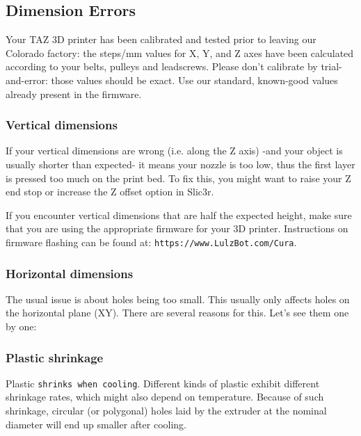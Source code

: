 
\subsection{Dimension Errors}
\label{sec:dimension_errors}

Your TAZ 3D printer has been calibrated and tested prior to leaving our Colorado factory: the steps/mm values for X, Y, and Z axes have been calculated according to your belts, pulleys and leadscrews. Please don't calibrate by trial-and-error: those values should be exact. Use our standard, known-good values already present in the firmware.

\subsubsection{Vertical dimensions}

If your vertical dimensions are wrong (i.e. along the Z axis) -and your object is usually shorter than expected- it means your nozzle is too low, thus the first layer is pressed too much on the print bed. To fix this, you might want to raise your Z end stop or increase the Z offset option in Slic3r.

If you encounter vertical dimensions that are half the expected height, make sure that you are using the appropriate firmware for your 3D printer. Instructions on firmware flashing can be found at: \texttt{https://www.LulzBot.com/Cura}.

\subsubsection{Horizontal dimensions}

The usual issue is about holes being too small. This usually only affects holes on the horizontal plane (XY). There are several reasons for this. Let's see them one by one:

\subsubsection{Plastic shrinkage}

Plastic \texttt{shrinks when cooling}. Different kinds of plastic exhibit different shrinkage rates, which might also depend on temperature. Because of such shrinkage, circular (or polygonal) holes laid by the extruder at the nominal diameter will end up smaller after cooling.

